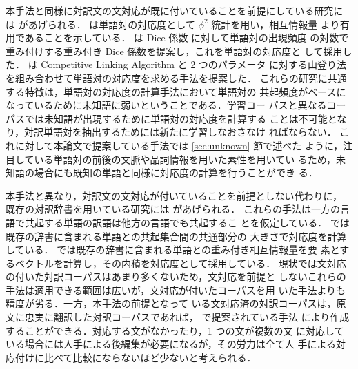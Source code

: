 本手法と同様に対訳文の文対応が既に付いていることを前提にしている研究に
は \cite{gale_91,kitamura_96,melamed_97} があげられる．
\cite{gale_91} は単語対の対応度として $\phi^2$ 統計を用い，相互情報量
より有用であることを示している．
\cite{kitamura_96} は Dice 係数\cite{kay_93} に対して単語対の出現頻度
の対数で重み付けする重み付き Dice 係数を提案し，これを単語対の対応度と
して採用した．
\cite{melamed_97} は Competitive Linking Algorithm と 2 つのパラメータ
に対する山登り法を組み合わせて単語対の対応度を求める手法を提案した．
これらの研究に共通する特徴は，単語対の対応度の計算手法において単語対の
共起頻度がベースになっているために未知語に弱いということである．学習コー
パスと異なるコーパスでは未知語が出現するために単語対の対応度を計算する
ことは不可能となり，対訳単語対を抽出するためには新たに学習しなおさなけ
ればならない．
これに対して本論文で提案している手法では \ref{sec:unknown} 節で述べた
ように，注目している単語対の前後の文脈や品詞情報を用いた素性を用いてい
るため，未知語の場合にも既知の単語と同様に対応度の計算を行うことができ
る．

本手法と異なり，対訳文の文対応が付いていることを前提としない代わりに，
既存の対訳辞書を用いている研究には \cite{kaji_96,fung_97} があげられる．
これらの手法は一方の言語で共起する単語の訳語は他方の言語でも共起するこ
とを仮定している．
\cite{kaji_96} では既存の辞書に含まれる単語との共起集合間の共通部分の
大きさで対応度を計算している．
\cite{fung_97} では既存の辞書に含まれる単語との重み付き相互情報量を要
素とするベクトルを計算し，その内積を対応度として採用している．
現状では文対応の付いた対訳コーパスはあまり多くないため，文対応を前提と
しないこれらの手法は適用できる範囲は広いが，文対応が付いたコーパスを用
いた手法よりも精度が劣る．一方，本手法の前提となって
いる文対応済の対訳コーパスは，原文に忠実に翻訳した対訳コーパスであれば，
\cite{kay_93,utsuro_94,sukehiro_95} で提案されている手法
により作成することができる．対応する文がなかったり，1 つの文が複数の文
に対応している場合には人手による後編集が必要になるが，その労力は全て人
手による対応付けに比べて比較にならないほど少ないと考えられる．

